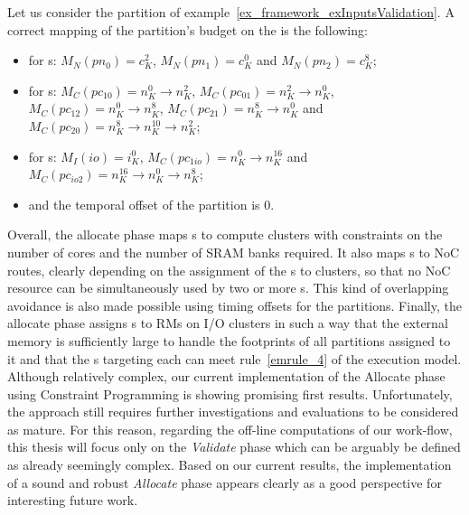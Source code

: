 \documentclass[main.tex]{subfiles}
\begin{document}
\begin{description}
        \begin{example}
            Let us consider the partition of
            example~\ref{ex_framework_exInputsValidation}. A correct mapping of
            the partition's budget on the \mppalong is the following:
            \begin{itemize}
                \item for \PN{}s: $M_N( pn_0 ) = c_K^2$, $M_N( pn_1 ) = c_K^0$ and $M_N( pn_2 ) = c_K^8$;
                \item for \PC{}s: 
                    $M_C( pc_{10} ) = n_K^0 \to n_K^2$, 
                    $M_C( pc_{01} ) = n_K^2 \to n_K^0$, 
                    $M_C( pc_{12} ) = n_K^0 \to n_K^8$, 
                    $M_C( pc_{21} ) = n_K^8 \to n_K^0$ and
                    $M_C( pc_{20} ) = n_K^8 \to n_K^{10} \to n_K^2$;
                \item for \ION{}s: $M_I(io) = i_K^0$, $M_C( pc_{1io} ) = n_K^0 \to n_K^{16}$ and $M_C( pc_{io2} ) = n_K^{16} \to n_K^0 \to n_K^8$;
                \item and the temporal offset of the partition is 0.
            \end{itemize}
        \end{example}
\end{description}

Overall, the allocate phase maps \PN{}s to compute clusters with constraints on
the number of cores and the number of SRAM banks required. It also maps \PC{}s
to NoC routes, clearly depending on the assignment of the \PN{}s to clusters,
so that no NoC resource can be simultaneously used by two or more \PC{}s. This
kind of overlapping avoidance is also made possible using timing offsets for
the partitions. Finally, the allocate phase assigns \ION{}s to RMs on I/O
clusters in such a way that the external memory is sufficiently large to handle
the footprints of all partitions assigned to it and that the \PC{}s targeting
each \ION{} can meet rule~\ref{emrule_4} of the execution model.\\


Although relatively complex, our current implementation of the Allocate phase
using Constraint Programming is showing promising first results. Unfortunately,
the approach still requires further investigations and evaluations to be
considered as mature. For this reason, regarding the off-line computations of
our work-flow, this thesis will focus only on the \emph{Validate} phase which
can be arguably be defined as already seemingly complex. Based on our current
results, the implementation of a sound and robust \emph{Allocate} phase appears
clearly as a good perspective for interesting future work.
\end{document}
